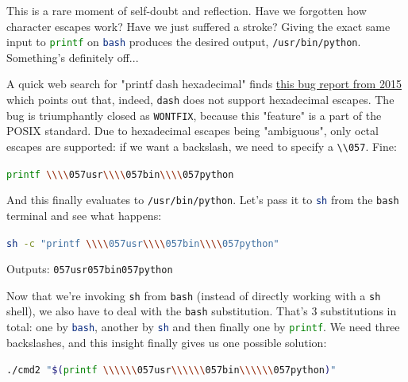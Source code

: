 \documentclass{article}
\newcommand{\xcode}[2]{\colorbox{ubuntuback}{\lstinline[language=#1]|#2|}}
\newcommand{\code}[1]{\colorbox{ubuntuback}{\texttt{#1}}}
\begin{document}
This is a rare moment of self-doubt and reflection. Have we forgotten how character escapes work? Have we just suffered a stroke? Giving the exact same input to \xcode{bash}{printf} on \xcode{bash}{bash} produces the desired output, \xcode{bash}{/usr/bin/python}. Something's definitely off...


A quick web search for "printf dash hexadecimal" finds \href{https://bugs.launchpad.net/ubuntu/+source/dash/+bug/1499473}{this bug report from 2015} which points out that, indeed, \xcode{bash}{dash} does not support hexadecimal escapes. The bug is triumphantly closed as \code{WONTFIX}, because this "feature" is a part of the POSIX standard. Due to hexadecimal escapes being "ambiguous", only octal escapes are supported: if we want a backslash, we need to specify a \xcode{bash}{\\057}. Fine:

\xcode{bash}{printf \\\\057usr\\\\057bin\\\\057python}

And this finally evaluates to \code{/usr/bin/python}. Let's pass it to \xcode{bash}{sh} from the \code{bash} terminal and see what happens:

\xcode{bash}{sh -c "printf \\\\057usr\\\\057bin\\\\057python"}

Outputs: \xcode{bash}{057usr057bin057python}

Now that we're invoking \code{sh} from \code{bash} (instead of directly working with a \code{sh} shell), we also have to deal with the \code{bash} substitution. That's 3 substitutions in total: one by \xcode{bash}{bash}, another by \xcode{bash}{sh} and then finally one by \xcode{bash}{printf}. We need three backslashes, and this insight finally gives us one possible solution:

\xcode{bash}{./cmd2 "$(printf \\\\\\057usr\\\\\\057bin\\\\\\057python)"}
\end{document}
